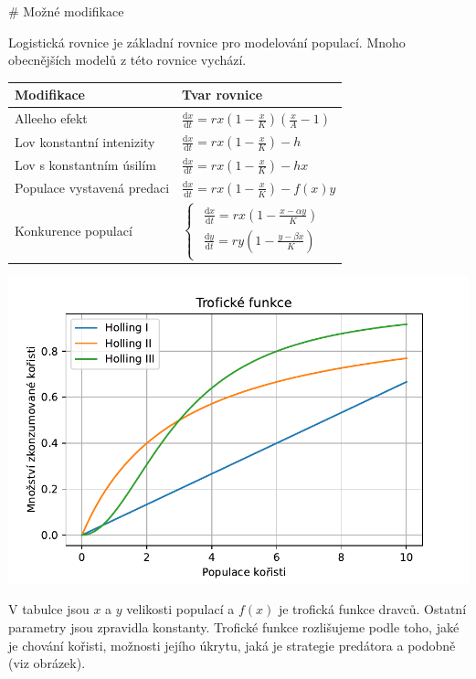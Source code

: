 \documentclass{article}
\begin{document}
\begin{markdown}

# Možné modifikace

Logistická rovnice je základní rovnice pro modelování populací. Mnoho obecnějších modelů z této rovnice vychází.

\end{markdown}

\begin{minipage}[t]{0.45\linewidth}
  \vspace*{0pt}
\everymath{\displaystyle}
\begin{tabular}{ll}
  \toprule
  Modifikace&Tvar rovnice\\
  \midrule
Alleeho efekt & $\frac{\mathrm dx}{\mathrm dt}=rx\left(1-\frac xK\right)\left(\frac
xA-1\right)$\\[5mm]
Lov konstantní intenizity & $\frac{\mathrm dx}{\mathrm dt}=rx\left(1-\frac xK\right)-h$\\[5mm]
Lov s konstantním úsilím & $\frac{\mathrm dx}{\mathrm dt}=rx\left(1-\frac xK\right)-hx$\\[5mm]
Populace vystavená predaci & $\frac{\mathrm dx}{\mathrm dt}=rx\left(1-\frac xK\right)-f(x)y$\\[5mm]
  Konkurence populací & $\begin{cases}
                        \begin{aligned}
           \frac{\mathrm dx}{\mathrm dt}=rx\left(1-\frac {x-\alpha y}K\right)\\
           \frac{\mathrm dy}{\mathrm dt}=ry\left(1-\frac {y-\beta x}K\right)
                        \end{aligned}
\end{cases}
$\\
  \bottomrule
\end{tabular}

\end{minipage}\hfill
\begin{minipage}[t]{0.45\linewidth}
  \vspace*{0pt}

  \includegraphics[width=\linewidth]{holling.pdf}

  \vspace*{0pt}
\end{minipage}


\bigskip
V tabulce jsou $x$ a $y$ velikosti populací a $f(x)$ je trofická funkce dravců. Ostatní parametry jsou zpravidla konstanty.
Trofické funkce rozlišujeme podle toho, jaké je chování kořisti, možnosti jejího úkrytu, jaká je strategie predátora a podobně (viz obrázek).
\end{document}
